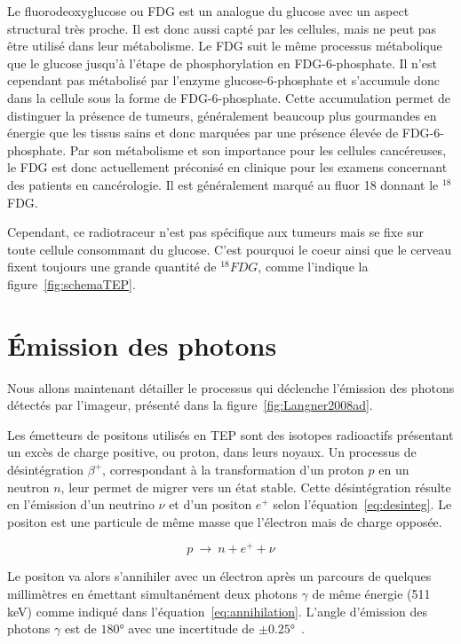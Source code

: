 Le fluorodeoxyglucose ou FDG est un analogue du glucose avec un aspect structural très proche. Il est donc aussi capté par les cellules, mais ne peut pas être utilisé dans leur métabolisme. Le FDG suit le même processus métabolique que le glucose jusqu’à l’étape de phosphorylation en FDG-6-phosphate. Il n’est cependant pas métabolisé par l’enzyme glucose-6-phosphate et s’accumule donc dans la cellule sous la forme de FDG-6-phosphate. Cette accumulation permet de distinguer la présence de tumeurs, généralement beaucoup plus gourmandes en énergie que les tissus sains et donc marquées par une présence élevée de FDG-6-phosphate. Par son métabolisme et son importance pour les cellules cancéreuses, le FDG est donc actuellement préconisé en clinique pour les examens concernant des patients en cancérologie. Il est généralement marqué au fluor 18 donnant le $^{18}$FDG.

Cependant, ce radiotraceur n'est pas spécifique aux tumeurs mais se fixe sur toute cellule consommant du glucose. C'est pourquoi le coeur ainsi que le cerveau fixent toujours une grande quantité de $^{18}FDG$, comme l'indique la figure~\ref{fig:schemaTEP}.

\section{\'Emission des photons}

Nous allons maintenant détailler le processus qui déclenche l'émission des photons détectés par l'imageur, présenté dans la figure~\ref{fig:Langner2008ad}.

Les émetteurs de positons utilisés en TEP sont des isotopes radioactifs présentant un excès de charge positive, ou proton, dans leurs noyaux. Un processus de désintégration $\beta^+$, correspondant à la transformation d’un proton $p$ en un neutron $n$, leur permet de migrer vers un état stable. Cette désintégration résulte en l’émission d’un neutrino $\nu$ et d’un positon $e^+$ selon l’équation~\ref{eq:desinteg}. Le positon est une particule de même masse que l’électron mais de charge opposée.

\begin{equation}
 p~\rightarrow~n + e^+ + \nu
\label{eq:desinteg}
\end{equation}

Le positon va alors s'annihiler avec un électron après un parcours de quelques millimètres en émettant simultanément deux photons $\gamma$ de même énergie (511 keV) comme indiqué dans l'équation~\ref{eq:annihilation}. L'angle d'émission des photons $\gamma$ est de $180°$ avec une incertitude de $\pm 0.25°$~\cite{bailey2005positon}.

